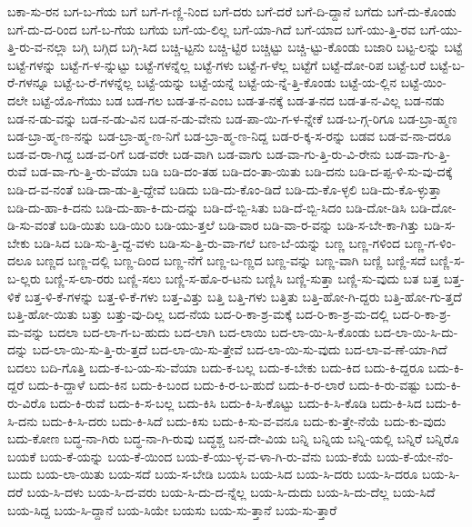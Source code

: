{ಬಕಾ-ಸು-ರನ
ಬಗ-ಬ-ಗೆಯ
ಬಗೆ
ಬಗೆ-ಗ-ಣ್ಣಿ-ನಿಂದ
ಬಗೆ-ದರು
ಬಗೆ-ದರೆ
ಬಗೆ-ದಿ-ದ್ದಾನೆ
ಬಗೆದು
ಬಗೆ-ದು-ಕೊಂಡು
ಬಗೆ-ದು-ದ-ರಿಂದ
ಬಗೆ-ಬ-ಗೆಯ
ಬಗೆಯ
ಬಗೆ-ಯ-ಲಿಲ್ಲ
ಬಗೆ-ಯಾ-ಗಿದೆ
ಬಗೆ-ಯಾದ
ಬಗೆ-ಯು-ತ್ತಿ-ರವ
ಬಗೆ-ಯು-ತ್ತಿ-ರು-ವ-ನಲ್ಲಾ
ಬಗ್ಗಿ
ಬಗ್ಗಿದ
ಬಗ್ಗಿ-ಸಿದ
ಬಚ್ಚಿ-ಟ್ಟನು
ಬಚ್ಚಿ-ಟ್ಟಿರ
ಬಚ್ಚಿಟ್ಟು
ಬಚ್ಚಿ-ಟ್ಟು-ಕೊಂಡು
ಬಜಾರಿ
ಬಟ್ಟ-ಲನ್ನು
ಬಟ್ಟೆ
ಬಟ್ಟೆ-ಗಳನ್ನು
ಬಟ್ಟೆ-ಗ-ಳ-ನ್ನುಟ್ಟು
ಬಟ್ಟೆ-ಗಳನ್ನೆಲ್ಲ
ಬಟ್ಟೆ-ಗಳು
ಬಟ್ಟೆ-ಗ-ಳೆಲ್ಲ
ಬಟ್ಟೆಗೆ
ಬಟ್ಟೆ-ದೋ-ರಿಪ
ಬಟ್ಟೆ-ಬರೆ
ಬಟ್ಟೆ-ಬ-ರೆ-ಗಳನ್ನೂ
ಬಟ್ಟೆ-ಬ-ರೆ-ಗಳನ್ನೆಲ್ಲ
ಬಟ್ಟೆ-ಯನ್ನು
ಬಟ್ಟೆ-ಯನ್ನೆ
ಬಟ್ಟೆ-ಯ-ನ್ನೆ-ತ್ತಿ-ಕೊಂಡು
ಬಟ್ಟೆ-ಯ-ಲ್ಲಿನ
ಬಟ್ಟೆ-ಯಿಂ-ದಲೇ
ಬಟ್ಟೆ-ಯೊ-ಗೆಯು
ಬಡ
ಬಡ-ಗಲ
ಬಡ-ತ-ನ-ಎಂಬ
ಬಡ-ತ-ನಕ್ಕೆ
ಬಡ-ತ-ನದ
ಬಡ-ತ-ನ-ವಿಲ್ಲ
ಬಡ-ನಡು
ಬಡ-ನ-ಡು-ವನ್ನು
ಬಡ-ನ-ಡು-ವಿನ
ಬಡ-ನ-ಡು-ವೇನು
ಬಡ-ಪಾ-ಯಿ-ಗ-ಳ-ನ್ನೇಕೆ
ಬಡ-ಬ-ಗ್ಗ-ರಿಗೂ
ಬಡ-ಬ್ರಾ-ಹ್ಮಣ
ಬಡ-ಬ್ರಾ-ಹ್ಮ-ಣ-ನನ್ನು
ಬಡ-ಬ್ರಾ-ಹ್ಮ-ಣ-ನಿಗೆ
ಬಡ-ಬ್ರಾ-ಹ್ಮ-ಣ-ನಿದ್ದ
ಬಡ-ರ-ಕ್ಕ-ಸ-ರನ್ನು
ಬಡವ
ಬಡ-ವ-ನಾ-ದರೂ
ಬಡ-ವ-ರಾ-ಗಿದ್ದ
ಬಡ-ವ-ರಿಗೆ
ಬಡ-ವರೇ
ಬಡ-ವಾಗಿ
ಬಡ-ವಾಗು
ಬಡ-ವಾ-ಗು-ತ್ತಿ-ರು-ವಿ-ರೇನು
ಬಡ-ವಾ-ಗು-ತ್ತಿ-ರುವೆ
ಬಡ-ವಾ-ಗು-ತ್ತಿ-ರು-ವೆಯಾ
ಬಡಿ
ಬಡಿ-ದಂ-ತಹ
ಬಡಿ-ದಂ-ತಾ-ಯಿತು
ಬಡಿ-ದನು
ಬಡಿ-ದ-ಪ್ಪ-ಳಿ-ಸು-ವು-ದಕ್ಕೆ
ಬಡಿ-ದ-ವ-ನಂತೆ
ಬಡಿ-ದಾ-ಡು-ತ್ತಿ-ದ್ದೇವೆ
ಬಡಿದು
ಬಡಿ-ದು-ಕೊಂ-ಡಿದೆ
ಬಡಿ-ದು-ಕೊ-ಳ್ಳಲಿ
ಬಡಿ-ದು-ಕೊ-ಳ್ಳುತ್ತಾ
ಬಡಿ-ದು-ಹಾ-ಕಿ-ದನು
ಬಡಿ-ದು-ಹಾ-ಕಿ-ದು-ದನ್ನು
ಬಡಿ-ದೆ-ಬ್ಬಿ-ಸಿತು
ಬಡಿ-ದೆ-ಬ್ಬಿ-ಸಿದಂ
ಬಡಿ-ದೋ-ಡಿಸಿ
ಬಡಿ-ದೋ-ಡಿ-ಸು-ವಂತೆ
ಬಡಿ-ಯಿತು
ಬಡಿ-ಯಿರಿ
ಬಡಿ-ಯು-ತ್ತಲೆ
ಬಡಿ-ವಾರ
ಬಡಿ-ವಾ-ರ-ವನ್ನು
ಬಡಿ-ಸ-ಬೇ-ಕಾ-ಗಿತ್ತು
ಬಡಿ-ಸ-ಬೇಕು
ಬಡಿ-ಸಿದ
ಬಡಿ-ಸು-ತ್ತಿ-ದ್ದ-ವಳು
ಬಡಿ-ಸು-ತ್ತಿ-ರು-ವಾ-ಗಲೆ
ಬಣ-ಬೆ-ಯನ್ನು
ಬಣ್ಣ
ಬಣ್ಣ-ಗಳಿಂದ
ಬಣ್ಣ-ಗ-ಳಿಂ-ದಲೂ
ಬಣ್ಣದ
ಬಣ್ಣ-ದಲ್ಲಿ
ಬಣ್ಣ-ದಿಂದ
ಬಣ್ಣ-ನೆಗೆ
ಬಣ್ಣ-ಬ-ಣ್ಣದ
ಬಣ್ಣ-ವನ್ನು
ಬಣ್ಣ-ವಾಗಿ
ಬಣ್ಣಿ
ಬಣ್ಣಿ-ಸದೆ
ಬಣ್ಣಿ-ಸ-ಬ-ಲ್ಲರು
ಬಣ್ಣಿ-ಸ-ಲಾ-ರರು
ಬಣ್ಣಿ-ಸಲು
ಬಣ್ಣಿ-ಸ-ಹೊ-ರ-ಟನು
ಬಣ್ಣಿಸಿ
ಬಣ್ಣಿ-ಸುತ್ತಾ
ಬಣ್ಣಿ-ಸು-ವುದು
ಬತ
ಬತ್ತ
ಬತ್ತ-ಳಿಕೆ
ಬತ್ತ-ಳಿ-ಕೆ-ಗಳನ್ನು
ಬತ್ತ-ಳಿ-ಕೆ-ಗಳು
ಬತ್ತ-ವಿತ್ತು
ಬತ್ತಿ
ಬತ್ತಿ-ಗಳು
ಬತ್ತಿತು
ಬತ್ತಿ-ಹೋ-ಗಿ-ದ್ದರು
ಬತ್ತಿ-ಹೋ-ಗು-ತ್ತದೆ
ಬತ್ತಿ-ಹೋ-ಯಿತು
ಬತ್ತು
ಬತ್ತು-ವು-ದಿಲ್ಲ
ಬದ-ನೆಯ
ಬದ-ರಿ-ಕಾ-ಶ್ರ-ಮಕ್ಕೆ
ಬದ-ರಿ-ಕಾ-ಶ್ರ-ಮ-ದಲ್ಲಿ
ಬದ-ರಿ-ಕಾ-ಶ್ರ-ಮ-ವನ್ನು
ಬದಲಾ
ಬದ-ಲಾ-ಗ-ಬ-ಹುದು
ಬದ-ಲಾಗಿ
ಬದ-ಲಾಯಿ
ಬದ-ಲಾ-ಯಿ-ಸಿ-ಕೊಂಡು
ಬದ-ಲಾ-ಯಿ-ಸಿ-ದು-ದನ್ನು
ಬದ-ಲಾ-ಯಿ-ಸು-ತ್ತಿ-ರು-ತ್ತದೆ
ಬದ-ಲಾ-ಯಿ-ಸು-ತ್ತೇವೆ
ಬದ-ಲಾ-ಯಿ-ಸು-ವುದು
ಬದ-ಲಾ-ವ-ಣೆ-ಯಾ-ಗಿದೆ
ಬದಲು
ಬದಿ-ಗೊತ್ತಿ
ಬದು-ಕ-ಬ-ಯ-ಸು-ವೆಯಾ
ಬದು-ಕ-ಬಲ್ಲ
ಬದು-ಕ-ಬೇಕು
ಬದು-ಕಿದ
ಬದು-ಕಿ-ದ್ದರೂ
ಬದು-ಕಿ-ದ್ದರೆ
ಬದು-ಕಿ-ದ್ದಾಳೆ
ಬದು-ಕಿನ
ಬದು-ಕಿ-ಬಂದ
ಬದು-ಕಿ-ರ-ಬ-ಹುದೆ
ಬದು-ಕಿ-ರ-ಲಾರೆ
ಬದು-ಕಿ-ರು-ವಷ್ಟು
ಬದು-ಕಿ-ರು-ವಿರೊ
ಬದು-ಕಿ-ರುವೆ
ಬದು-ಕಿ-ಸ-ಬಲ್ಲ
ಬದು-ಕಿಸಿ
ಬದು-ಕಿ-ಸಿ-ಕೊಟ್ಟು
ಬದು-ಕಿ-ಸಿ-ಕೊಡಿ
ಬದು-ಕಿ-ಸಿದ
ಬದು-ಕಿ-ಸಿ-ದನು
ಬದು-ಕಿ-ಸಿ-ದರು
ಬದು-ಕಿ-ಸಿದೆ
ಬದು-ಕಿಸು
ಬದು-ಕಿ-ಸು-ವ-ವನೂ
ಬದು-ಕು-ತ್ತೇ-ನೆಯೆ
ಬದು-ಕು-ವುದು
ಬದು-ಕೋಣ
ಬದ್ಧ-ನಾ-ಗಿರು
ಬದ್ಧ-ನಾ-ಗಿ-ರುವು
ಬದ್ಧಶ್ಚ
ಬನ-ದೇ-ವಿಯ
ಬನ್ನಿ
ಬನ್ನಿಯ
ಬನ್ನಿ-ಯಲ್ಲಿ
ಬನ್ನಿರೆ
ಬನ್ನಿರೊ
ಬಯಕೆ
ಬಯ-ಕೆ-ಯನ್ನು
ಬಯ-ಕೆ-ಯಿಂದ
ಬಯ-ಕೆ-ಯು-ಳ್ಳ-ವ-ಳಾ-ಗಿ-ರು-ವೆನು
ಬಯ-ಕೆಯೆ
ಬಯ-ಕೆ-ಯೇ-ನೆಂ-ಬುದು
ಬಯ-ಲಾ-ಯಿತು
ಬಯ-ಸದೆ
ಬಯ-ಸ-ಬೇಡಿ
ಬಯಸಿ
ಬಯ-ಸಿದ
ಬಯ-ಸಿ-ದರು
ಬಯ-ಸಿ-ದರೂ
ಬಯ-ಸಿ-ದರೆ
ಬಯ-ಸಿ-ದಳು
ಬಯ-ಸಿ-ದ-ವರು
ಬಯ-ಸಿ-ದು-ದ-ನ್ನೆಲ್ಲ
ಬಯ-ಸಿ-ದುದು
ಬಯ-ಸಿ-ದು-ದೆಲ್ಲ
ಬಯ-ಸಿದೆ
ಬಯ-ಸಿದ್ದ
ಬಯ-ಸಿ-ದ್ದಾನೆ
ಬಯ-ಸಿಯೇ
ಬಯಸು
ಬಯ-ಸು-ತ್ತಾನೆ
ಬಯ-ಸು-ತ್ತಾರೆ
}
